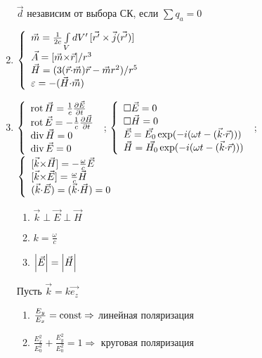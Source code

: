 \begin{enumerate}[label=\textbf{\underline{\arabic*.}}]
      $\vec{d}$ независим от выбора СК, если $\sum q_a=0 $
\item $\left\{\begin{array}{l}
            \vec{m} = \frac1{2c}\int\limits_V dV'\,[\vec{r'}\times\vec{j}(\vec{r'})]\\
            \vec{A} = [\vec{m}{\times}\vec{r}]/r^3\\
            \vec{H} = (3(\vec{r}{\cdot}\vec{m})\vec{r}-\vec{m}r^2)/r^5\\
            \varepsilon = -(\vec{H}{\cdot}\vec{m})
      \end{array}\right.$
\item $\left\{\begin{array}{l}
            \operatorname{rot}\vec{H}=\frac1{c}\frac{\partial \vec{E}}{\partial t}\\
            \operatorname{rot}\vec{E}=-\frac1{c}\frac{\partial \vec{H}}{\partial t}\\
            \operatorname{div}\vec{H}=0\\
            \operatorname{div}\vec{E}=0\\
      \end{array}\right.$  ;
      $\left\{\begin{array}{l}
            \square\vec{E}=0\\
            \square\vec{H}=0\\
            \vec{E}=\vec{E_0}\exp(-i(\omega t-(\vec{k}{\cdot}\vec{r})))\\
            \vec{H}=\vec{H_0}\exp(-i(\omega t-(\vec{k}{\cdot}\vec{r})))
      \end{array}\right.$  ;
      $\left\{\begin{array}{l}
            \vmult{k}{H}=-\frac{\omega}{c}\vec{E}\\
            \vmult{k}{E}=\frac{\omega}{c}\vec{H}\\
            \scmult{k}{E}=\scmult{k}{H}=0
      \end{array}\right.$\\
      \begin{enumerate}
      \item $\vec{k}\perp\vec{E}\perp\vec{H} $
      \item $k=\frac{\omega}{c} $
      \item $\left| \vec{E} \right| = \left| \vec{H} \right|$
      \end{enumerate}
      Пусть $\vec{k}=k\vec{e_z} $\\
      \begin{enumerate}
      \item $\frac{E_y}{E_x}=\operatorname{const}\Rightarrow$ линейная поляризация
      \item $\frac{E_x^2}{E_0^2}+\frac{E_y^2}{E_0^2}=1 \Rightarrow$ круговая поляризация

\end{enumerate}
\end{enumerate}
